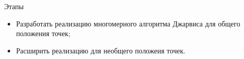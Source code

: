 \documentclass[]{beamer} %
\begin{document}
\begin{frame}{Этапы}
       \begin{itemize}
        \item  Разработать реализацию многомерного алгоритма Джарвиса для общего положения точек;
        \item Расширить реализацию для необщего положеия точек.
        \end{itemize}
\end{frame}



\end{document}

